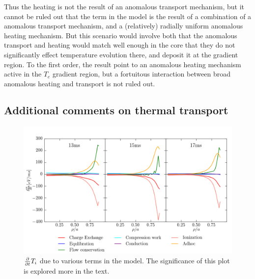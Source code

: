 Thus the \adhoc heating is not the result of an anomalous transport mechanism, but it cannot be ruled out that the \adhoc term in the model is the result of a combination of a anomalous transport mechanism, and a (relatively) radially uniform anomalous heating mechanism. But this scenario would involve both that the anomalous transport and heating would match well enough in the core that they do not significantly effect temperature evolution there, and deposit it at the gradient region. To the first order, the result point to an anomalous heating mechanism active in the $T_e$ gradient region, but a fortuitous interaction between broad anomalous heating and transport is not ruled out.

\subsection{Additional comments on thermal transport}

\begin{figure}
    \centering
    \includegraphics[width = \linewidth]{ion_transport_results/dtempdt_with_adhoc.png}
    \caption[$\partialt T_i$ due to various terms]{$\partialt T_i$ due to various terms in the model. The significance of this plot is explored more in the text. }
    \label{fig:temperature_change}
\end{figure}

